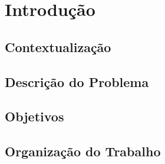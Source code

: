 \chapter [Introdução]{Introdução}

\section{Contextualização}


\section{Descrição do Problema}


\section{Objetivos}

\section{Organização do Trabalho}


